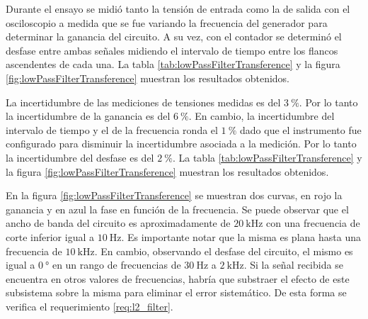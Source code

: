 Durante el ensayo se midió tanto la tensión de entrada como la de salida con el osciloscopio a medida que se fue variando la frecuencia del generador para determinar la ganancia del circuito. A su vez, con el contador se determinó el desfase entre ambas señales midiendo el intervalo de tiempo entre los flancos ascendentes de cada una. La tabla \ref{tab:lowPassFilterTransference} y la figura \ref{fig:lowPassFilterTransference} muestran los resultados obtenidos.

La incertidumbre de las mediciones de tensiones medidas es del $\SI{3}{\percent}$. Por lo tanto la incertidumbre de la ganancia es del $\SI{6}{\percent}$. En cambio, la incertidumbre del intervalo de tiempo y el de la frecuencia ronda el $\SI{1}{\percent}$ dado que el instrumento fue configurado para disminuir la incertidumbre asociada a la medición. Por lo tanto la incertidumbre del desfase es del $\SI{2}{\percent}$. La tabla \ref{tab:lowPassFilterTransference} y la figura \ref{fig:lowPassFilterTransference} muestran los resultados obtenidos.

En la figura \ref{fig:lowPassFilterTransference} se muestran dos curvas, en rojo la ganancia y en azul la fase en función de la frecuencia. Se puede observar que el ancho de banda del circuito es aproximadamente de $\SI{20}{\kHz}$ con una frecuencia de corte inferior igual a $\SI{10}{\Hz}$. Es importante notar que la misma es plana hasta una frecuencia de $\SI{10}{\kHz}$. En cambio, observando el desfase del circuito, el mismo es igual a $\SI{0}{\degree}$ en un rango de frecuencias de $\SI{30}{\Hz}$ a $\SI{2}{\kHz}$. Si la señal recibida se encuentra en otros valores de frecuencias, habría que substraer el efecto de este subsistema sobre la misma para eliminar el error sistemático. De esta forma se verifica el requerimiento \ref{req:l2_filter}.

